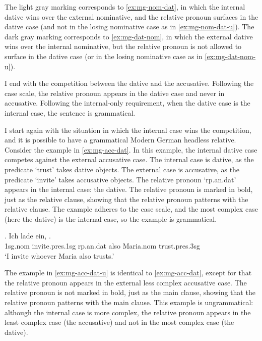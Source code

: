 The light gray marking corresponds to \ref{ex:mg-nom-dat}, in which the internal dative wins over the external nominative, and the relative pronoun surfaces in the dative case (and not in the losing nominative case as in \ref{ex:mg-nom-dat-u}).
The dark gray marking corresponds to \ref{ex:mg-dat-nom}, in which the external dative wins over the internal nominative, but the relative pronoun is not allowed to surface in the dative case (or in the losing nominative case as in \ref{ex:mg-dat-nom-u}).

I end with the competition between the dative and the accusative. Following the case scale, the relative pronoun appears in the dative case and never in accusative. Following the internal-only requirement, when the dative case is the internal case, the sentence is grammatical.

I start again with the situation in which the internal case wins the competition, and it is possible to have a grammatical Modern German headless relative.
Consider the example in \ref{ex:mg-acc-dat}. In this example, the internal dative case competes against the external accusative case.
The internal case is dative, as the predicate  `trust' takes dative objects.
The external case is accusative, as the predicate  `invite' takes accusative objects.
The relative pronoun  `\ac{rp}.\ac{an}.\ac{dat}' appears in the internal case: the dative. The relative pronoun is marked in bold, just as the relative clause, showing that the relative pronoun patterns with the relative clause.
The example adheres to the case scale, and the most complex case (here the dative) is the internal case, so the example is grammatical.

\exg. Ich {lade ein},    . \\
1\ac{sg}.\ac{nom} invite.\ac{pres}.1\ac{sg}\scsub{[acc]} \ac{rp}.\ac{an}.\ac{dat} also Maria.\ac{nom} trust.\ac{pres}.3\ac{sg}\scsub{[dat]}\\
`I invite whoever Maria also trusts.' \label{ex:mg-acc-dat}

The example in \ref{ex:mg-acc-dat-u} is identical to \ref{ex:mg-acc-dat}, except for that the relative pronoun appears in the external less complex accusative case.
The relative pronoun is not marked in bold, just as the main clause, showing that the relative pronoun patterns with the main clause.
This example is ungrammatical: although the internal case is more complex, the relative pronoun appears in the least complex case (the accusative) and not in the most complex case (the dative).

